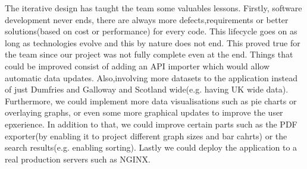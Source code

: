 \documentclass{l3proj}
\begin{document}
The iterative design has taught the team some valuables lessons. Firstly, software development never ends, there are
always more defects,requirements or better solutions(based on cost or performance) for every code. This lifecycle goes
on as long as technologies evolve and this by nature does not end. This proved true for the team since our project was
not fully complete even at the end. Things that could be improved consist of adding an API importer which would allow
automatic data updates. Also,involving more datasets to the application instead of just Dumfries and Galloway and
Scotland wide(e.g. having UK wide data). Furthermore, we could implement more data visualisations such as pie charts
or overlaying graphs, or even some more graphical updates to improve the user epxerience. In addition to that, we could
improve certain parts such as the PDF exporter(by enabling it to project different graph sizes and bar cahrts) or the
search results(e.g. enabling sorting). Lastly we could deploy the application to a real production servers such as NGINX.





\end{document}
